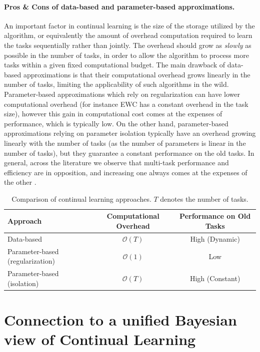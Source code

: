 \documentclass{article} %
\begin{document}
\paragraph{Pros \& Cons of data-based and parameter-based approximations.} An important factor in continual learning is the size of the storage utilized by the algorithm, or equivalently the amount of overhead computation required to learn the tasks sequentially rather than jointly. The overhead should grow as \emph{slowly} as possible in the number of tasks, in order to allow the algorithm to process more tasks within a given fixed computational budget. The main drawback of data-based approximations is that their computational overhead grows linearly in the number of tasks, limiting the applicability of such algorithms in the wild. Parameter-based approximations which rely on regularization can have lower computational overhead (for instance EWC has a constant overhead in the task size), however this gain in computational cost comes at the expenses of performance, which is typically low. On the other hand, parameter-based approximations relying on parameter isolation typically have an overhead growing linearly with the number of tasks (as the number of parameters is linear in the number of tasks), but they guarantee a constant performance on the old tasks. In general, across the literature we observe that multi-task performance and efficiency are in opposition, and increasing one always comes at the expenses of the other \citep{de_lange_continual_2022}. 

\begin{table}[h]
\centering
\caption{Comparison of continual learning approaches. $T$ denotes the number of tasks.}
\label{tab:cl_overhead}
\begin{tabular}{lcc}
\toprule
\textbf{Approach} & \textbf{Computational Overhead} & \textbf{Performance on Old Tasks} \\
\midrule
Data-based & $\mathcal{O}(T)$ & High (Dynamic)\\
Parameter-based (regularization) & $\mathcal{O}(1)$ & Low \\
Parameter-based (isolation) & $\mathcal{O}(T)$ & High (Constant) \\
\bottomrule
\end{tabular}
\end{table}

\section{Connection to a unified Bayesian view of Continual Learning}
\end{document}
